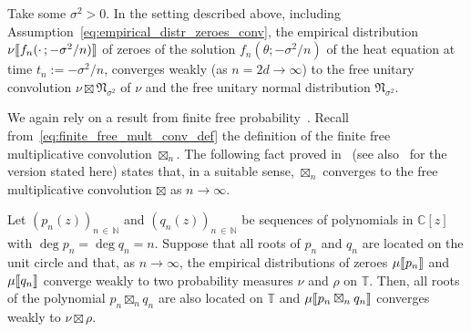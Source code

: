 \documentclass[AHL,Unicode,longabstracts,published]{cedram}
\newcommand{\llbracket}{\mathopen{[\mkern -2.7mu[}}
\newcommand{\rrbracket}{\mathclose{]\mkern -2.7mu]}}
\newcommand{\lsem}{\llbracket}
\newcommand{\rsem}{\rrbracket}
\newcommand{\fnorm}{\mathfrak{N}}
\newcommand{\bT}{\mathbb{T}}
\newcommand{\N}{\mathbb{N}}
\newcommand{\C}{\mathbb{C}}
\begin{document}
\begin{theo}\label{theo:heat_flow_zeroes}
Take some $\sigma^2>0$. In the setting described above, including Assumption~\eqref{eq:empirical_distr_zeroes_conv}, the empirical distribution $\nu\lsem f_{n}(\cdot\,;-\sigma^2/n)\rsem$ of zeroes of the solution $f_{n}(\theta; -\sigma^2/n)$ of the heat equation at time $t_{n} := -\sigma^2/n$, converges weakly (as $n=2d\to\infty$) to the free unitary convolution $\nu \boxtimes \fnorm_{\sigma^2}$ of $\nu$ and the free unitary normal distribution $\fnorm_{\sigma^2}$.
\end{theo}

We again rely on a result from finite free probability~\cite{marcus_spielman_srivastava,marcus}. Recall from~\eqref{eq:finite_free_mult_conv_def} the definition of the finite free multiplicative convolution $\boxtimes_{n}$. The following fact proved in~\cite[Proposition~3.4]{arizmendi_garza_vargas_perales} (see also~\cite[Proposition~2.9]{kabluchko_rep_diff_free_poi} for the version stated here) states that, in a suitable sense, $\boxtimes_n$ converges to the free multiplicative convolution $\boxtimes$ as $n\to\infty$.

\begin{prop}\label{prop:finite_free_mult_conv_to_free_mult}
Let $(p_n(z))_{n\,\in\,\N}$ and $(q_n(z))_{n\,\in\,\N}$ be sequences of polynomials in $\C[z]$ with $\deg p_n = \deg q_n = n$. Suppose that all roots of $p_n$ and $q_n$ are located on the unit circle and that, as $n\to\infty$, the empirical distributions of zeroes $\mu\lsem p_{n}\rsem$ and $\mu\lsem q_{n}\rsem$ converge weakly to two probability measures $\nu$ and $\rho$ on $\bT$. Then, all roots of the polynomial $p_n \boxtimes_n q_n$ are also located on $\bT$ and $\mu \lsem p_n \boxtimes_n q_n\rsem$ converges weakly to $\nu \boxtimes \rho$.
\end{prop}
\end{document}

